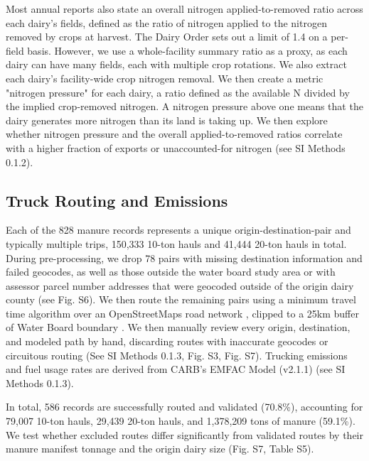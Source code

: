\documentclass{iopjournal}
\begin{document}
Most annual reports also state an overall nitrogen applied-to-removed ratio across each dairy's fields, defined as the ratio of nitrogen applied to the nitrogen removed by crops at harvest. The Dairy Order sets out a limit of 1.4 on a per-field basis. However, we use a whole-facility summary ratio as a proxy, as each dairy can have many fields, each with multiple crop rotations. We also extract each dairy's facility-wide crop nitrogen removal. We then create a metric "nitrogen pressure" for each dairy, a ratio defined as the available N divided by the implied crop-removed nitrogen. A nitrogen pressure above one means that the dairy generates more nitrogen than its land is taking up. We then explore whether nitrogen pressure and the overall applied-to-removed ratios correlate with a higher fraction of exports or unaccounted-for nitrogen (see SI Methods 0.1.2).

\subsection{Truck Routing and Emissions}

Each of the 828 manure records represents a unique origin-destination-pair and typically multiple trips, 150,333 10-ton hauls and 41,444 20-ton hauls in total. During pre-processing, we drop 78 pairs with missing destination information and failed geocodes, as well as those outside the water board study area or with assessor parcel number addresses that were geocoded outside of the origin dairy county (see Fig. S6). We then route the remaining pairs using a minimum travel time algorithm over an OpenStreetMaps road network \cite{OSM_California_2025}, clipped to a 25km buffer of Water Board boundary \cite{Water_Board_Boundaries}. We then manually review every origin, destination, and modeled path by hand, discarding routes with inaccurate geocodes or circuitous routing (See SI Methods 0.1.3, Fig. S3, Fig. S7). Trucking emissions and fuel usage rates are derived from CARB's EMFAC Model (v2.1.1) \cite{EMFAC_Emissions} (see SI Methods 0.1.3).

In total, 586 records are successfully routed and validated (70.8\%), accounting for 79,007 10-ton hauls, 29,439 20-ton hauls, and 1,378,209 tons of manure (59.1\%). We test whether excluded routes differ significantly from validated routes by their manure manifest tonnage and the origin dairy size (Fig. S7, Table S5).
\end{document}

